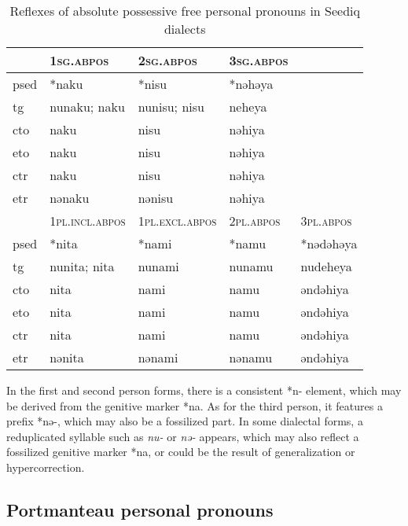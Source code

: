 \begin{table}[!htbp]
\centering
\caption{Reflexes of absolute possessive free personal pronouns in Seediq dialects}
\label{tab:possfree}
\begin{tabular}{lllll}
\hline
      & \textsc{1sg.abpos}      & \textsc{2sg.abpos}      & \textsc{3sg.abpos} &           \\ \hline
\acs{psed} & *naku       & *nisu       & *nəhəya &           \\
\acs{tg}  & nunaku; naku      & nunisu; nisu      & neheya     &           \\
\acs{cto}  & naku        & nisu       & nəhiya  &           \\
\acs{eto}  & naku        & nisu       & nəhiya  &           \\
\acs{ctr} & naku        & nisu        & nəhiya  &           \\
\acs{etr} & nənaku        & nənisu        & nəhiya  &           \\ \hline
      & \textsc{1pl.incl.abpos} & \textsc{1pl.excl.abpos} & \textsc{2pl.abpos} & \textsc{3pl.abpos}   \\ \hline
\acs{psed} & *nita       & *nami       & *namu  & *nədəhəya \\
\acs{tg}  & nunita; nita     & nunami          & nunamu & nudeheya       \\
\acs{cto}  & nita        & nami        & namu   & əndəhiya  \\
\acs{eto}  & nita        & nami        & namu   & əndəhiya  \\
\acs{ctr} & nita        & nami        & namu   & əndəhiya  \\
\acs{etr} & nənita        & nənami        & nənamu   & əndəhiya  \\ \hline
\end{tabular}
\end{table}

In the first and second person forms, there is a consistent *n- element, which may be derived from the genitive marker *na. As for the third person, it features a prefix *nə-, which may also be a fossilized part. In some dialectal forms, a reduplicated syllable such as \textit{nu-} or \textit{nə-} appears, which may also reflect a fossilized genitive marker *na, or could be the result of generalization or hypercorrection.

\subsection{Portmanteau personal pronouns}

